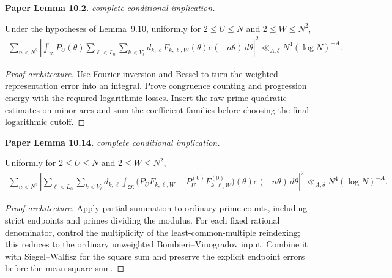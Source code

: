 \begin{lemma}
\label{goldbach_minor}
\leanok
\par\medskip\noindent\textbf{Paper Lemma 10.2.} \textit{complete conditional implication.}\par
Under the hypotheses of Lemma~\textup{9.10}, uniformly for
\(2\leq U\leq N\) and \(2\leq W\leq N^2\),
\begin{align}
 \sum_{n<N^2}\left|
 \int_{\mathfrak m}P_U(\theta)
 \sum_{\ell<L_0}\sum_{k<V_\ell}
 d_{k,\ell}F_{k,\ell,W}(\theta)e(-n\theta)\,d\theta
 \right|^2
 \ll_{A,\delta}N^4(\log N)^{-A}.
\end{align}
\end{lemma}
\begin{proof}[Proof architecture]
\leanok
Use Fourier inversion and Bessel to turn the weighted representation error into an integral. Prove congruence counting and progression energy with the required logarithmic losses. Insert the raw prime quadratic estimates on minor arcs and sum the coefficient families before choosing the final logarithmic cutoff.
\end{proof}

\begin{lemma}
\label{goldbach_major}
\leanok
\par\medskip\noindent\textbf{Paper Lemma 10.14.} \textit{complete conditional implication.}\par
Uniformly for \(2\leq U\leq N\) and \(2\leq W\leq N^2\),
\begin{align}
 \sum_{n<N^2}\left|
 \sum_{\ell<L_0}\sum_{k<V_\ell}d_{k,\ell}
 \int_{\mathfrak M}
 \bigl(P_UF_{k,\ell,W}
 -P_U^{(0)}F_{k,\ell,W}^{(0)}\bigr)(\theta)
 e(-n\theta)\,d\theta
 \right|^2
 \ll_{A,\delta}N^4(\log N)^{-A}.
\end{align}
\end{lemma}
\begin{proof}[Proof architecture]
\leanok
Apply partial summation to ordinary prime counts, including strict endpoints and primes dividing the modulus. For each fixed rational denominator, control the multiplicity of the least-common-multiple reindexing; this reduces to the ordinary unweighted Bombieri--Vinogradov input. Combine it with Siegel--Walfisz for the square sum and preserve the explicit endpoint errors before the mean-square sum.
\end{proof}

